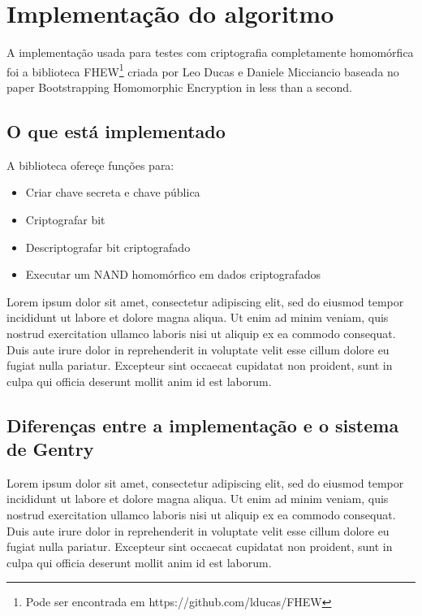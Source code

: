 \chapter{Implementação do algoritmo}
\label{resultados}
A implementação usada para testes com criptografia completamente homomórfica foi a biblioteca FHEW\footnote{Pode ser encontrada em https://github.com/lducas/FHEW} criada por Leo Ducas e Daniele Micciancio baseada no paper Bootstrapping Homomorphic Encryption in less than a second.
	
\section{O que está implementado}
A biblioteca ofereçe funções para:
\begin{itemize}
	\item Criar chave secreta e chave pública
	\item Criptografar bit
	\item Descriptografar bit criptografado
	\item Executar um NAND homomórfico em dados criptografados
\end{itemize}

Lorem ipsum dolor sit amet, consectetur adipiscing elit, sed do eiusmod tempor incididunt ut labore et dolore magna aliqua. Ut enim ad minim veniam, quis nostrud exercitation ullamco laboris nisi ut aliquip ex ea commodo consequat. Duis aute irure dolor in reprehenderit in voluptate velit esse cillum dolore eu fugiat nulla pariatur. Excepteur sint occaecat cupidatat non proident, sunt in culpa qui officia deserunt mollit anim id est laborum.

\section{Diferenças entre a implementação e o sistema de Gentry}
Lorem ipsum dolor sit amet, consectetur adipiscing elit, sed do eiusmod tempor incididunt ut labore et dolore magna aliqua. Ut enim ad minim veniam, quis nostrud exercitation ullamco laboris nisi ut aliquip ex ea commodo consequat. Duis aute irure dolor in reprehenderit in voluptate velit esse cillum dolore eu fugiat nulla pariatur. Excepteur sint occaecat cupidatat non proident, sunt in culpa qui officia deserunt mollit anim id est laborum.